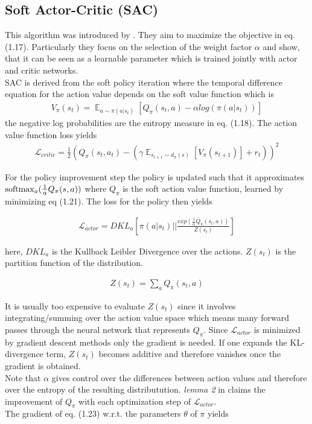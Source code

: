 \subsection{Soft Actor-Critic (SAC)}
This algorithm was introduced by \cite{haarnoja2018soft}. They aim to maximize the objective in eq. (1.17). Particularly they focus on the selection of the weight factor $\alpha$ and show, that it can be seen as a learnable parameter which is trained jointly with actor and critic networks.\\
SAC is derived from the soft policy iteration where the temporal difference equation for the action value depends on the soft value function which is
\begin{align}
	V_{\pi}(s_t) = \mathop{\mathbb{E}}_{a \sim \pi(a|s_t)} \left[ Q_{\pi}(s_t, a) - \alpha log( \pi(a|s_t)) \right]
\end{align}
the negative log probabilities are the entropy measure in eq. (1.18). The action value function loss yields
\begin{align}
	\mathcal{L}_{critic} = \frac{1}{2}(Q_{\pi}(s_t, a_t) - (\gamma \mathop{\mathbb{E}}_{s_{t+1} \sim d_{\pi}(s)} \left[ V_{\pi}(s_{t+1})\right] + r_t)) ^ 2
\end{align}

For the policy improvement step the policy is updated such that it approximates $\operatorname*{softmax}_a(\frac{1}{\alpha}Q_{\pi}(s, a))$ where $Q_{\pi}$ is the soft action value function, learned by minimizing eq (1.21). The loss for the policy then yields

\begin{align}
\mathcal{L}_{actor} = DKL_{a}\left[ \pi(a| s_t) \bigg|\bigg| \frac{exp(\frac{1}{\alpha} Q_{\pi}(s_t, a))}{Z(s_t)} \right]
\end{align}

here, $DKL_{a}$ is the Kullback Leibler Divergence over the actions. $Z(s_t)$ is the partition function of the distribution. 

\begin{align}
	Z(s_t) = \sum_a Q_{\pi} (s_t, a)
\end{align}

It is usually too expensive to evaluate $Z(s_t)$ since it involves integrating/summing over the action value space which means many forward passes through the neural network that represents $Q_{\pi}$. Since $\mathcal{L}_{actor}$ is minimized by gradient descent methods only the gradient is needed. If one expands the KL-divergence term, $Z(s_t)$ becomes additive and therefore vanishes once the gradient is obtained.\\
Note that $\alpha$ gives control over the differences between action values and therefore over the entropy of the resulting distributution. \emph{lemma 2} in \cite{haarnoja2018soft} claims the improvement of $Q_{\pi}$ with each optimization step of $\mathcal{L}_{actor}$.\\
The gradient of eq. (1.23) w.r.t. the parameters $\theta$ of $\pi$ yields


